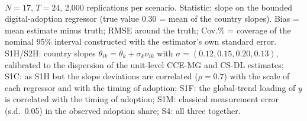 \\[3pt]\begin{minipage}{\tablewidth}\footnotesize $N=17$, $T=24$, 2,000 replications per scenario. Statistic: slope on the bounded digital-adoption regressor (true value 0.30 = mean of the country slopes). Bias = mean estimate minus truth; RMSE around the truth; Cov.\% = coverage of the nominal 95\% interval constructed with the estimator's own standard error. S1H/S2H: country slopes $\theta_{ik}=\theta_k+\sigma_k\nu_{ik}$ with $\sigma=(0.12,0.15,0.20,0.13)$, calibrated to the dispersion of the unit-level CCE-MG and CS-DL estimates; S1C: as S1H but the slope deviations are correlated ($\rho=0.7$) with the scale of each regressor and with the timing of adoption; S1F: the global-trend loading of $y$ is correlated with the timing of adoption; S1M: classical measurement error (s.d.\ 0.05) in the observed adoption share; S4: all three together.\end{minipage}

